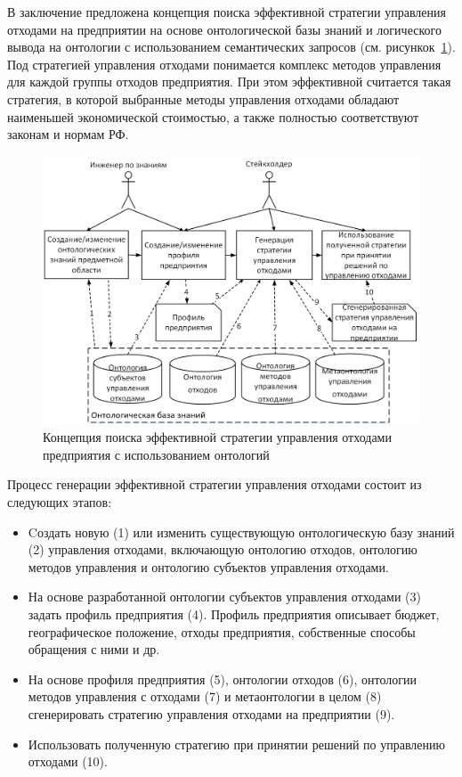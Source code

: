 \documentclass[a4paper]{G2-105}
\begin{document}
В заключение предложена концепция поиска эффективной стратегии управления отходами на предприятии на основе онтологической базы знаний и логического вывода на онтологии с использованием семантических запросов (см. рисункок~\ref{fig:wm_concept}). Под стратегией управления отходами понимается комплекс методов управления для каждой группы отходов предприятия. При этом эффективной считается такая стратегия, в которой выбранные методы управления отходами обладают наименьшей экономической стоимостью, а также полностью соответствуют законам и нормам РФ.

\begin{figure}[H]
\centering
\includegraphics[scale=0.5]{wm_concept}
\caption{Концепция поиска эффективной стратегии управления отходами предприятия с использованием онтологий}
\label{fig:wm_concept}
\end{figure}

Процесс генерации эффективной стратегии управления отходами состоит из следующих этапов:
\begin{itemize}
\item [1] Cоздать новую (1) или изменить существующую онтологическую базу знаний (2) управления отходами, включающую онтологию отходов, онтологию методов управления и онтологию субъектов управления отходами.
\item [2] На основе разработанной онтологии субъектов управления отходами (3) задать профиль предприятия (4). 
Профиль предприятия описывает бюджет, географическое положение, отходы предприятия, собственные способы обращения с ними и др.
\item [3] На основе профиля предприятия (5), онтологии отходов (6), онтологии методов управления с отходами (7) и метаонтологии в целом (8) сгенерировать стратегию управления отходами на предприятии (9).
\item [4] Использовать полученную стратегию при принятии решений по управлению отходами (10).
\end{itemize}
\end{document}
